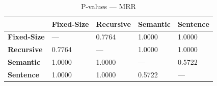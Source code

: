 \begin{table}
\caption{P-values — MRR}
\label{tab:pvalues_mrr}
\begin{tabular}{lllll}
\toprule
 & Fixed-Size & Recursive & Semantic & Sentence \\
\midrule
\textbf{Fixed-Size} & — & 0.7764 & 1.0000 & 1.0000 \\
\textbf{Recursive} & 0.7764 & — & 1.0000 & 1.0000 \\
\textbf{Semantic} & 1.0000 & 1.0000 & — & 0.5722 \\
\textbf{Sentence} & 1.0000 & 1.0000 & 0.5722 & — \\
\bottomrule
\end{tabular}
\end{table}
